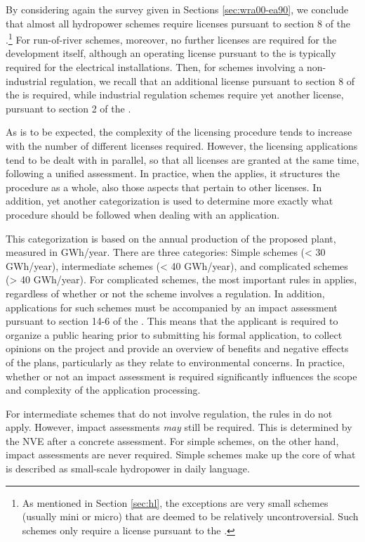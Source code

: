 By considering again the survey given in Sections \ref{sec:wra00-ea90}, we conclude that almost all hydropower schemes require licenses pursuant to section 8 of the \cite{wra00}.\footnote{As mentioned in Section \ref{sec:hl}, the exceptions are very small schemes (usually mini or micro) that are deemed to be relatively uncontroversial. Such schemes only require a license pursuant to the \cite{pb08}.} For run-of-river schemes, moreover, no further licenses are required for the development itself, although an operating license pursuant to the \cite{ea90} is typically required for the electrical installations. Then, for schemes involving a non-industrial regulation, we recall that an additional license pursuant to section 8 of the \cite{wra17} is required, while industrial regulation schemes require yet another license, pursuant to section 2 of the \cite{ica17}.

As is to be expected, the complexity of the licensing procedure tends to increase with the number of different licenses required. However, the licensing applications tend to be dealt with in parallel, so that all licenses are granted at the same time, following a unified assessment. In practice, when the \cite{wra17} applies, it structures the procedure as a whole, also those aspects that pertain to other licenses. In addition, yet another categorization is used to determine more exactly what procedure should be followed when dealing with an application.

This categorization is based on the annual production of the proposed plant, measured in GWh/year. There are three categories: Simple schemes (< 30 GWh/year), intermediate schemes (< 40 GWh/year), and complicated schemes (> 40 GWh/year). For complicated schemes, the most important rules in \cite{wra17} applies, regardless of whether or not the scheme involves a regulation. In addition, applications for such schemes must be accompanied by an impact assessment pursuant to section 14-6 of the \cite{pb08}. This means that the applicant is required to organize a public hearing prior to submitting his formal application, to collect opinions on the project and provide an overview of benefits and negative effects of the plans, particularly as they relate to environmental concerns. In practice, whether or not an impact assessment is required significantly influences the scope and complexity of the application processing.

For intermediate schemes that do not involve regulation, the rules in \cite{wra17} do not apply. However, impact assessments {\it may} still be required. This is determined by the NVE after a concrete assessment. For simple schemes, on the other hand, impact assessments are never required. Simple schemes make up the core of what is described as small-scale hydropower in daily language.

